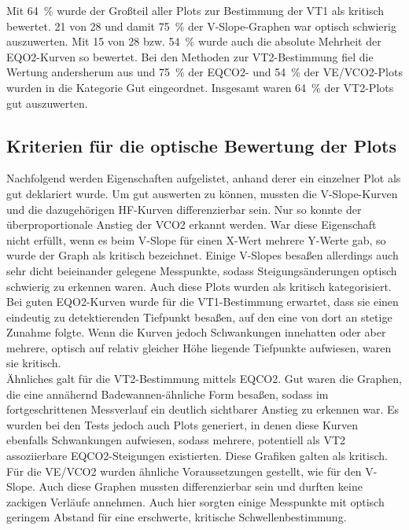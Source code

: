 %
Mit 64~\% wurde der Großteil aller Plots zur Bestimmung der VT1 als kritisch bewertet. 21 von 28 und damit 75~\% der V-Slope-Graphen war optisch schwierig auszuwerten. Mit 15 von 28 bzw. 54~\% wurde auch die absolute Mehrheit der \acs{EQO2}-Kurven so bewertet. Bei den Methoden zur VT2-Bestimmung fiel die Wertung andersherum aus und 75~\% der \acs{EQCO2}- und 54~\% der \acs{VE}/\acs{VCO2}-Plots wurden in die Kategorie Gut eingeordnet. Insgesamt waren 64~\% der VT2-Plots gut auszuwerten.
%
\subsection{Kriterien für die optische Bewertung der Plots}
%
Nachfolgend werden Eigenschaften aufgelistet, anhand derer ein einzelner Plot als gut deklariert wurde. Um gut auswerten zu können, mussten die V-Slope-Kurven und die dazugehörigen \acs{HF}-Kurven differenzierbar sein. Nur so konnte der überproportionale Anstieg der \acs{VCO2} erkannt werden. War diese Eigenschaft nicht erfüllt, wenn es beim V-Slope für einen X-Wert mehrere Y-Werte gab, so wurde der Graph als kritisch bezeichnet. Einige V-Slopes besaßen allerdings auch sehr dicht beieinander gelegene Messpunkte, sodass Steigungsänderungen optisch schwierig zu erkennen waren. Auch diese Plots wurden als kritisch kategorisiert.\\
Bei guten \acs{EQO2}-Kurven wurde für die VT1-Bestimmung erwartet, dass sie einen eindeutig zu detektierenden Tiefpunkt besaßen, auf den eine von dort an stetige Zunahme folgte. Wenn die Kurven jedoch Schwankungen innehatten oder aber mehrere, optisch auf relativ gleicher Höhe liegende Tiefpunkte aufwiesen, waren sie kritisch.\\
Ähnliches galt für die VT2-Bestimmung mittels \acs{EQCO2}. Gut waren die Graphen, die eine annähernd Badewannen-ähnliche Form besaßen, sodass im fortgeschrittenen Messverlauf ein deutlich sichtbarer Anstieg zu erkennen war. Es wurden bei den Tests jedoch auch Plots generiert, in denen diese Kurven ebenfalls Schwankungen aufwiesen, sodass mehrere, potentiell als VT2 assoziierbare \acs{EQCO2}-Steigungen existierten. Diese Grafiken galten als kritisch.\\
Für die \acs{VE}/\acs{VCO2} wurden ähnliche Voraussetzungen gestellt, wie für den V-Slope. Auch diese Graphen mussten differenzierbar sein und durften keine zackigen Verläufe annehmen. Auch hier sorgten einige Messpunkte mit optisch geringem Abstand für eine erschwerte, kritische Schwellenbestimmung. 
%
